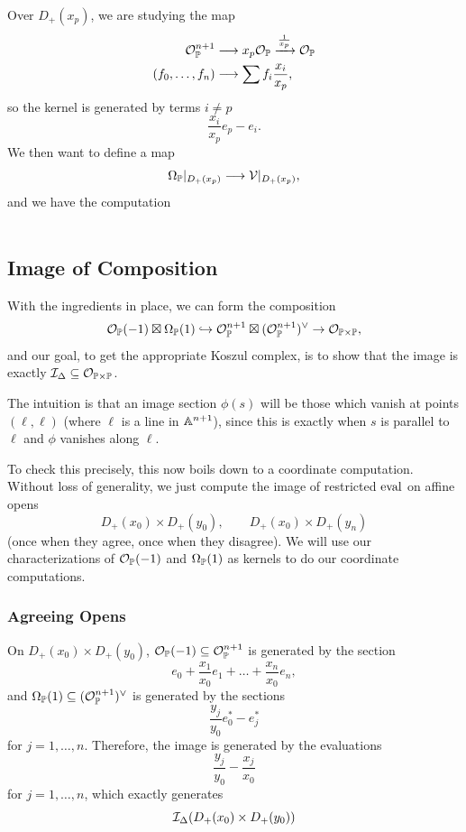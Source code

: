 \documentclass[12pt]{article}
\begin{document}

Over $D_+(x_p)$, we are studying the map
\begin{align*}
    \cO_\P^{n+1} &\longrightarrow x_p \cO_\P \xrightarrow{\frac{1}{x_p}} \cO_\P\\
    (f_0,\dots,f_n) &\longrightarrow \sum f_i \frac{x_i}{x_p},
\end{align*}
so the kernel is generated by terms $i\neq p$
\[\frac{x_i}{x_p} e_p - e_i.\]
We then want to define a map
\[ \Omega_\P|_{D_+(x_p)} \longrightarrow \cV|_{D_+(x_p)},\]
and we have the computation
\[\frac{}{}\]

\subsection{Image of Composition}
With the ingredients in place, we can form the composition
\[\cO_\P(-1) \boxtimes \Omega_\P(1) \hookrightarrow \cO_\P^{n+1} \boxtimes (\cO_\P^{n+1})^\vee \to \cO_{\P\times \P},\]
and our goal, to get the appropriate Koszul complex, is to show that the image is exactly $\cI_\Delta \subseteq \cO_{\P\times \P}$.

The intuition is that an image section $\phi(s)$ will be those which vanish at points $(\ell,\ell)$ (where $\ell$ is a line in $\A^{n+1}$), since this is exactly when $s$ is parallel to $\ell$ and $\phi$ vanishes along $\ell$.

To check this precisely, this now boils down to a coordinate computation. Without loss of generality, we just compute the image of restricted $\eval$ on affine opens
\[D_+(x_0)\times D_+(y_0), \qquad D_+(x_0)\times D_+(y_n)\]
(once when they agree, once when they disagree). We will use our characterizations of $\cO_\P(-1)$ and $\Omega_\P(1)$ as kernels to do our coordinate computations.

\subsubsection{Agreeing Opens}

On $D_+(x_0)\times D_+(y_0)$, $\cO_\P(-1)\subseteq \cO_\P^{n+1}$ is generated by the section
\[e_0 + \frac{x_1}{x_0} e_1 + \dots + \frac{x_n}{x_0} e_n,\]
and $\Omega_\P(1) \subseteq (\cO_\P^{n+1})^\vee$ is generated by the sections
\[\frac{y_j}{y_0} e_0^* - e_j^*\]
for $j=1,\dots,n$. Therefore, the image is generated by the evaluations
\[\frac{y_j}{y_0} - \frac{x_j}{x_0}\]
for $j=1,\dots,n$, which exactly generates
\[\cI_\Delta(D_+(x_0) \times D_+(y_0))\]
\end{document}
